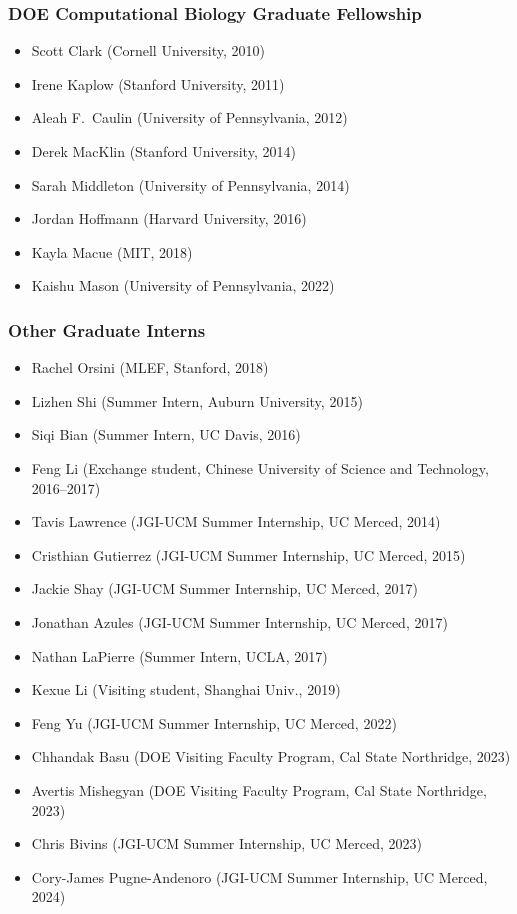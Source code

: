 \documentclass[11pt,letterpaper]{article}
\newenvironment{cvlist}
  {\begin{itemize}[leftmargin=1.4em, label=\textcolor{accent2}{\small$\bullet$},
    itemsep=2.5pt, topsep=2pt, parsep=0pt]}
  {\end{itemize}}
\begin{document}
\subsubsection*{\small DOE Computational Biology Graduate Fellowship}
\begin{cvlist}
  \item Scott Clark (Cornell University, 2010)
  \item Irene Kaplow (Stanford University, 2011)
  \item Aleah F.\ Caulin (University of Pennsylvania, 2012)
  \item Derek MacKlin (Stanford University, 2014)
  \item Sarah Middleton (University of Pennsylvania, 2014)
  \item Jordan Hoffmann (Harvard University, 2016)
  \item Kayla Macue (MIT, 2018)
  \item Kaishu Mason (University of Pennsylvania, 2022)
\end{cvlist}

\subsubsection*{\small Other Graduate Interns}
\begin{cvlist}
  \item Rachel Orsini (MLEF, Stanford, 2018)
  \item Lizhen Shi (Summer Intern, Auburn University, 2015)
  \item Siqi Bian (Summer Intern, UC Davis, 2016)
  \item Feng Li (Exchange student, Chinese University of Science and Technology, 2016--2017)
  \item Tavis Lawrence (JGI-UCM Summer Internship, UC Merced, 2014)
  \item Cristhian Gutierrez (JGI-UCM Summer Internship, UC Merced, 2015)
  \item Jackie Shay (JGI-UCM Summer Internship, UC Merced, 2017)
  \item Jonathan Azules (JGI-UCM Summer Internship, UC Merced, 2017)
  \item Nathan LaPierre (Summer Intern, UCLA, 2017)
  \item Kexue Li (Visiting student, Shanghai Univ., 2019)
  \item Feng Yu (JGI-UCM Summer Internship, UC Merced, 2022)
  \item Chhandak Basu (DOE Visiting Faculty Program, Cal State Northridge, 2023)
  \item Avertis Mishegyan (DOE Visiting Faculty Program, Cal State Northridge, 2023)
  \item Chris Bivins (JGI-UCM Summer Internship, UC Merced, 2023)
  \item Cory-James Pugne-Andenoro (JGI-UCM Summer Internship, UC Merced, 2024)
\end{cvlist}
\end{document}
